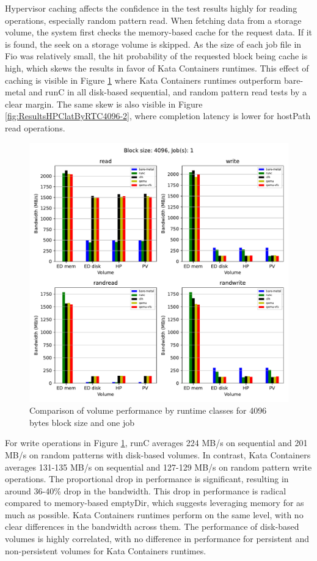 Hypervisor caching affects the confidence in the test results highly for reading operations, especially random pattern read. When fetching data from a storage volume, the system first checks the memory-based cache for the request data. If it is found, the seek on a storage volume is skipped. As the size of each job file in Fio was relatively small, the hit probability of the requested block being cache is high, which skews the results in favor of Kata Containers runtimes. This effect of caching is visible in Figure \ref{fig:ResultsVolumeByRTC4096-1} where Kata Containers runtimes outperform bare-metal and runC in all disk-based sequential, and random pattern read tests by a clear margin. The same skew is also visible in Figure \ref{fig:ResultsHPClatByRTC4096-2}, where completion latency is lower for hostPath read operations.

\begin{figure}[ht]
  \begin{center}
    \includegraphics[width=12cm]{results/subplot_bw_by_volume_with_bare(4096,1).pdf}
    \caption{Comparison of volume performance by runtime classes for 4096 bytes block size and one job}
    \label{fig:ResultsVolumeByRTC4096-1}
  \end{center}
\end{figure}

For write operations in Figure \ref{fig:ResultsVolumeByRTC4096-1}, runC averages 224 MB/s on sequential and 201 MB/s on random patterns with disk-based volumes. In contrast, Kata Containers averages 131-135 MB/s on sequential and 127-129 MB/s on random pattern write operations. The proportional drop in performance is significant, resulting in around 36-40\% drop in the bandwidth. This drop in performance is radical compared to memory-based emptyDir, which suggests leveraging memory for as much as possible. Kata Containers runtimes perform on the same level, with no clear differences in the bandwidth across them. The performance of disk-based volumes is highly correlated, with no difference in performance for persistent and non-persistent volumes for Kata Containers runtimes.
    
